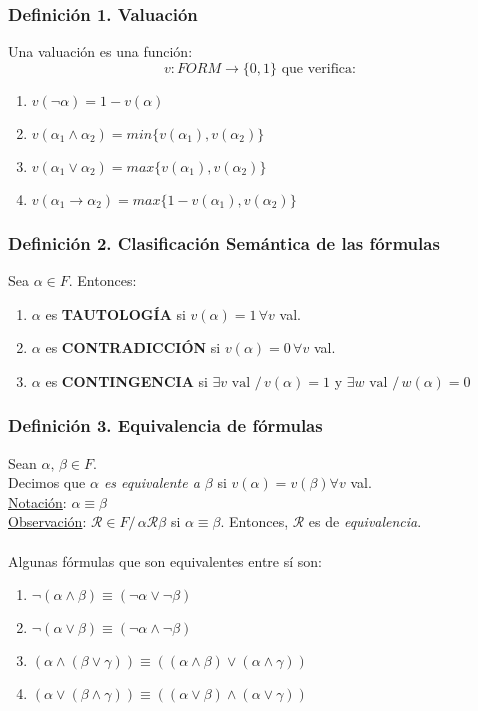 \documentclass{article}
\newcommand{\comma}{,\,}                                %
\newcommand{\tq}{/\,}                                   %
\newcommand{\relates}{\mathcal{R}}                      %
\begin{document}
\subsubsection*{Definición 1. Valuación}
Una valuación es una función:
\begin{equation*}
    v : FORM \rightarrow \{0,1\} \text{ que verifica:}
\end{equation*}
\begin{enumerate}
    \item $v(\neg \alpha) = 1 - v(\alpha)$
    \item $v(\alpha_1 \wedge \alpha_2) = min\{v(\alpha_1), v(\alpha_2)\}$
    \item $v(\alpha_1 \vee \alpha_2) = max\{v(\alpha_1), v(\alpha_2)\}$
    \item $v(\alpha_1 \rightarrow \alpha_2) = max\{1 - v(\alpha_1), v(\alpha_2)\}$
\end{enumerate}

\subsubsection*{Definición 2. Clasificación Semántica de las fórmulas}
Sea $\alpha \in F$. Entonces:
\begin{enumerate}
    \item $\alpha$ es \textbf{TAUTOLOGÍA} si $v(\alpha) = 1 \, \forall v$ val.
    \item $\alpha$ es \textbf{CONTRADICCIÓN} si $v(\alpha) = 0 \, \forall v$ val.
    \item $\alpha$ es \textbf{CONTINGENCIA} si $\exists v \text{ val } \tq v(\alpha) = 1$ y $\exists w \text{ val } \tq w(\alpha) = 0$
\end{enumerate}

\subsubsection*{Definición 3. Equivalencia de fórmulas}
Sean $\alpha \comma \beta \in F$. 
\\Decimos que \emph{$\alpha$ es equivalente a $\beta$} si $v(\alpha) = v(\beta) \forall v$ val.
\\\underline{Notación}: $\alpha \equiv \beta$
\\\underline{Observación}: $\relates \in F \tq \alpha \relates \beta$ si $\alpha \equiv \beta$. Entonces, $\relates$ es de \emph{equivalencia}.
\\\\Algunas fórmulas que son equivalentes entre sí son:
\begin{enumerate}
    \item $\neg (\alpha \wedge \beta) \equiv (\neg \alpha \vee \neg \beta)$
    \item $\neg (\alpha \vee \beta) \equiv (\neg \alpha \wedge \neg \beta)$
    \item $(\alpha \wedge (\beta \vee \gamma)) \equiv ((\alpha \wedge \beta) \vee (\alpha \wedge \gamma))$
    \item $(\alpha \vee (\beta \wedge \gamma)) \equiv ((\alpha \vee \beta) \wedge (\alpha \vee \gamma))$
\end{enumerate}
\end{document}
